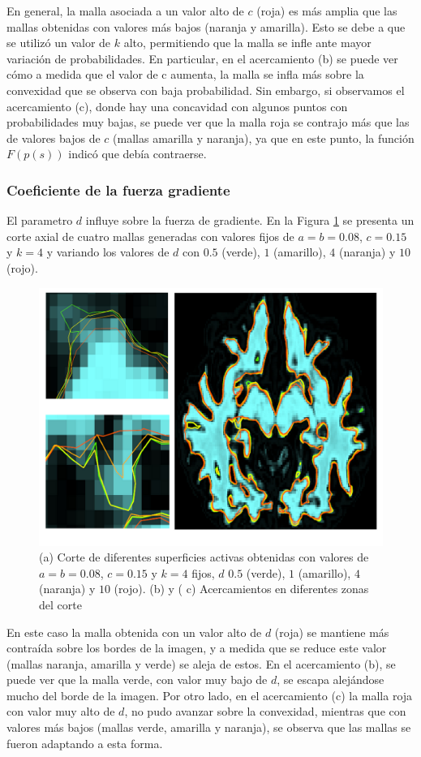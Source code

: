 En general, la malla asociada a un valor alto de  $c$ (roja) es más amplia que las mallas obtenidas con valores más bajos (naranja y amarilla). Esto se debe a que se utilizó un valor de $k$ alto, permitiendo que la malla se infle ante mayor variación de probabilidades. En particular, en el acercamiento (b) se puede ver cómo a medida que el valor de c aumenta, la malla se infla más sobre la convexidad que se observa con baja probabilidad. Sin embargo, si observamos el acercamiento (c), donde hay una concavidad con algunos puntos con probabilidades muy bajas, se puede ver que la malla roja se contrajo más que las de valores bajos de $c$ (mallas amarilla y naranja), ya que en este punto, la función $F(p(s))$ indicó que debía contraerse.

\subsubsection{Coeficiente de la fuerza gradiente}
El parametro $d$ influye sobre la fuerza de gradiente. En la Figura \ref{fig:sensibilidad6} se presenta un corte axial de cuatro mallas generadas con valores fijos de $a=b=0.08$, $c=0.15$ y $k=4$ y variando los valores de $d$ con $0.5$ (verde), $1$ (amarillo), $4$ (naranja) y $10$ (rojo).

\begin{figure}[H]
	\centering
	\includegraphics[scale=0.05]{images/sensibilidad6.jpg}
	\caption{(a) Corte de diferentes superficies activas obtenidas con valores de $a=b=0.08$, $c=0.15$ y $k=4$ fijos, $d$ $0.5$ (verde), $1$ (amarillo), $4$ (naranja) y $10$ (rojo). (b) y ( c) Acercamientos en diferentes zonas del corte}
	\label{fig:sensibilidad6}
\end{figure}

En este caso la malla obtenida con un valor alto de $d$ (roja) se mantiene más contraída sobre los bordes de la imagen, y a medida que se reduce este valor (mallas naranja, amarilla y verde) se aleja de estos. En el acercamiento (b), se puede ver que la malla verde, con valor muy bajo de $d$, se escapa alejándose mucho del borde de la imagen. Por otro lado, en el acercamiento (c) la malla roja con valor muy alto de $d$, no pudo avanzar sobre la convexidad, mientras que con valores más bajos (mallas verde, amarilla y naranja), se observa que las mallas se fueron adaptando a esta forma.
